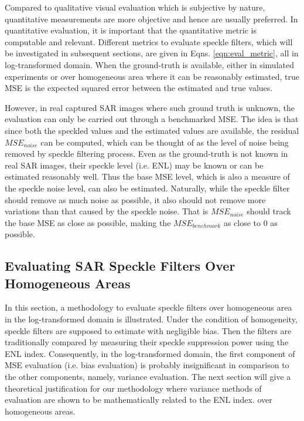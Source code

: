 Compared to qualitative visual evaluation which is subjective by nature,
  quantitative measurements are more objective and hence are usually preferred.
In quantitative evaluation, it is important that the quantitative metric is computable and relevant.
Different metrics to evaluate speckle filters, which will be investigated in subsequent sections, 
are given in Eqns. \ref{eqn:eval_metric}, all in log-transformed domain.
When the ground-truth is available, 
	either in simulated experiments or over homogeneous area where it can be reasonably estimated, 
	true MSE is the expected squared error between the estimated and true values.

However, in real captured SAR images where such ground truth is unknown,
  the evaluation can only be carried out through a benchmarked MSE. 
The idea is that since both the speckled values and the estimated values are available, the residual $MSE_{noise}$ 
can be computed, which can be thought of as the level of noise being removed by speckle filtering process.
Even as the ground-truth is not known in real SAR images, their speckle level (i.e. ENL) may be known or can be 
estimated reasonably well.
Thus the base MSE level, which is also a measure of the speckle noise level, can also be estimated.
Naturally, while the speckle filter should remove as much noise as possible, 
	it also should not remove more variations than that caused by the speckle noise.
That is $MSE_{noise}$ should track the base MSE as close as possible,
  making the $MSE_{benchmark}$ as close to 0 as possible.
        
\subsection{Evaluating SAR Speckle Filters Over Homogeneous Areas}
        

In this section, a methodology to evaluate speckle filters over homogeneous area in the log-transformed domain is 
illustrated. Under the condition of homogeneity, speckle filters are supposed to estimate with negligible bias.
Then the filters are traditionally compared by measuring their speckle suppression power using the ENL index.
Consequently, in the log-transformed domain, the first component of MSE evaluation (i.e. bias evaluation) is 
probably insignificant in comparison to the other components, namely, variance evaluation. 
The next section will give a theoretical justification for our methodology where variance 
methods of evaluation are shown to be mathematically related to the ENL index.
over homogeneous areas.

